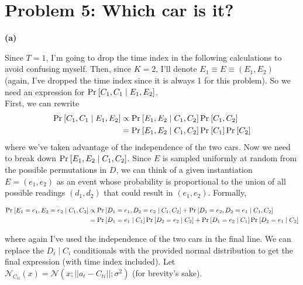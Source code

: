 \documentclass[11pt]{article}
\begin{document}
\clearpage
\section*{Problem 5: Which car is it?}


\textbf{(a)} 

 Since $T=1$, I'm going to drop the time index in the following calculations to avoid confusing myself. Then, since $K=2$, I'll denote $E_1 \equiv E \equiv (E_{1}, E_{2})$ (again, I've dropped the time index since it is always 1 for this problem). So we need an expression for $\text{Pr}_{}\left[C_{1}, C_{1} \mid E_{1}, E_{2}\right]$. \\
 
 First, we can rewrite
 \begin{align}
 	\text{Pr}_{}\left[C_{1}, C_{1} \mid E_{1}, E_{2}\right]
 		&\propto \text{Pr}_{}\left[E_{1}, E_{2} \mid C_{1}, C_{2}\right] \text{Pr}_{}\left[C_1, C_2\right] \\
 		&=  \text{Pr}_{}\left[E_{1}, E_{2} \mid C_{1}, C_{2}\right] \text{Pr}_{}\left[C_1\right] \text{Pr}_{}\left[C_2\right]
 \end{align}
 where we've taken advantage of the independence of the two cars. Now we need to break down $\text{Pr}_{}\left[E_{1}, E_{2} \mid C_1, C_2\right]$. Since $E$ is sampled uniformly at random from the possible permutations in $D$, we can think of a given instantiation $E = (e_1, e_2)$ as an event whose probability is proportional to the union of all possible readings $(d_1, d_2)$ that could result in $(e_1, e_2)$. Formally,
 \begin{small}
 \begin{align}
 	\text{Pr}_{}\left[E_1=e_1, E_2=e_2 \mid C_1, C_2\right] 
 		&\propto \text{Pr}_{}\left[D_1 = e_{1}, D_2 = e_2 \mid C_1, C_2\right] + \text{Pr}_{}\left[D_1=e_2, D_2=e_1 \mid C_1, C_2\right] \\
 		&= \text{Pr}_{}\left[D_1=e_1 \mid C_1\right]\text{Pr}_{}\left[D_2=e_2 \mid C_2\right] + \text{Pr}_{}\left[D_1=e_2 \mid C_1\right] \text{Pr}_{}\left[D_2=e_1 \mid C_2\right]
 \end{align}
 \end{small}
 where again I've used the independence of the two cars in the final line. We can replace the $D_i\mid C_i$ conditionals with the provided normal distribution to get the final expression (with time index included). Let $\mathcal{N}_{C_{ti}}(x) = \mathcal{N}(x; ||a_t - C_{ti}||; \sigma^2)$ (for brevity's sake).
 
\end{document}

